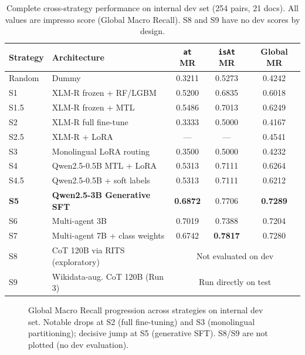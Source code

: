 \documentclass{ceurart}
\begin{document}
\begin{table}[ht]
  \caption{Complete cross-strategy performance on internal dev set (254 pairs, 21 docs). All values are impresso score (Global Macro Recall). S8 and S9 have no dev scores by design.}
  \label{tab:all}
  \centering
  \begin{tabular}{llccc}
    \toprule
    \textbf{Strategy} & \textbf{Architecture} & \textbf{\texttt{at} MR} & \textbf{\texttt{isAt} MR} & \textbf{Global MR} \\
    \midrule
    Random & Dummy & 0.3211 & 0.5273 & 0.4242 \\
    S1 & XLM-R frozen + RF/LGBM & 0.5200 & 0.6835 & 0.6018 \\
    S1.5 & XLM-R frozen + MTL & 0.5486 & 0.7013 & 0.6249 \\
    S2 & XLM-R full fine-tune & 0.3333 & 0.5000 & 0.4167 \\
    S2.5 & XLM-R + LoRA & --- & --- & 0.4541 \\
    S3 & Monolingual LoRA routing & 0.3500 & 0.5000 & 0.4232 \\
    S4 & Qwen2.5-0.5B MTL + LoRA & 0.5313 & 0.7111 & 0.6264 \\
    S4.5 & Qwen2.5-0.5B + soft labels & 0.5313 & 0.7111 & 0.6212 \\
    \textbf{S5} & \textbf{Qwen2.5-3B Generative SFT} & \textbf{0.6872} & 0.7706 & \textbf{0.7289} \\
    S6 & Multi-agent 3B & 0.7019 & 0.7388 & 0.7204 \\
    S7 & Multi-agent 7B + class weights & 0.6742 & \textbf{0.7817} & 0.7280 \\
    S8 & CoT 120B via RITS (exploratory) & \multicolumn{3}{c}{Not evaluated on dev} \\
    S9 & Wikidata-aug. CoT 120B (Run 3) & \multicolumn{3}{c}{Run directly on test} \\
    \bottomrule
  \end{tabular}
\end{table}

\begin{figure}[ht]
  \centering
  \caption{Global Macro Recall progression across strategies on internal dev set. Notable drops at S2 (full fine-tuning) and S3 (monolingual partitioning); decisive jump at S5 (generative SFT). S8/S9 are not plotted (no dev evaluation).}
  \label{fig:progression}
\end{figure}
\end{document}
